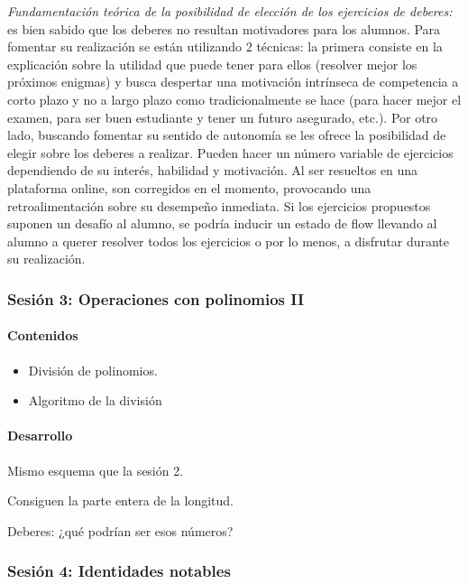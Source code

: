 \textit{
	Fundamentación teórica de la posibilidad de elección de los ejercicios de deberes:} 
	es bien sabido que los deberes no resultan motivadores para los alumnos. 
	Para fomentar su realización se están utilizando 2 técnicas: 
	la primera consiste en la explicación sobre la utilidad que puede tener para ellos (resolver mejor los próximos enigmas) y busca despertar una motivación intrínseca de competencia a corto plazo y no a largo plazo como tradicionalmente se hace (para hacer mejor el examen, para ser buen estudiante y tener un futuro asegurado, etc.).
	Por otro lado, buscando fomentar su sentido de autonomía se les ofrece la posibilidad de elegir sobre los deberes a realizar. 
	Pueden hacer un número variable de ejercicios dependiendo de su interés, habilidad y motivación.
	Al ser resueltos en una plataforma online, son corregidos en el momento, provocando una retroalimentación sobre su desempeño inmediata.
	Si los ejercicios propuestos suponen un desafío al alumno, se podría inducir un estado de flow llevando al alumno a querer resolver todos los ejercicios o por lo menos, a disfrutar durante su realización.



\subsubsection{Sesión 3: Operaciones con polinomios II}

\paragraph{Contenidos}
\begin{itemize}
	\item División de polinomios.
	\item Algoritmo de la división
\end{itemize}

\paragraph{Desarrollo}
Mismo esquema que la sesión 2.

Consiguen la parte entera de la longitud.

Deberes: ¿qué podrían ser esos números?


\subsubsection{Sesión 4: Identidades notables}

